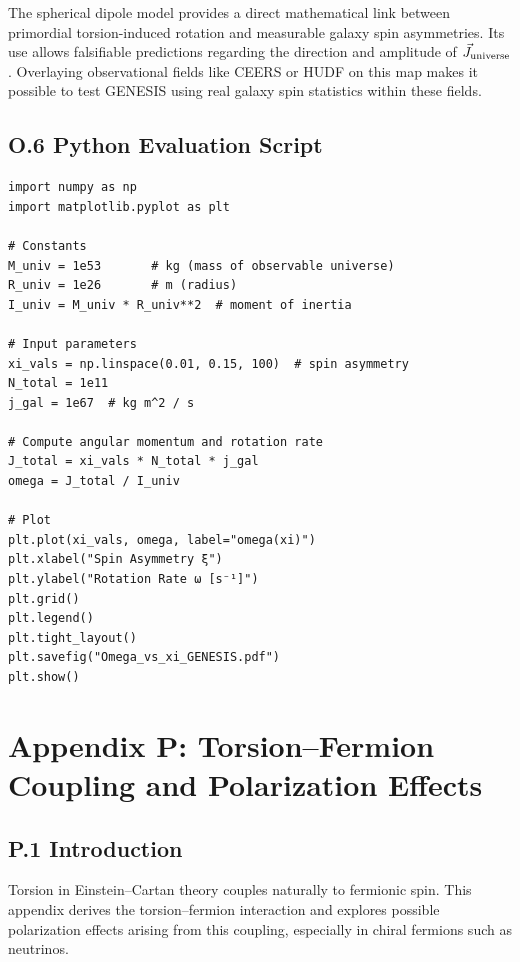 \documentclass{article}
\begin{document}
\begin{tcolorbox}[colback=gray!5, colframe=black!30, title=Why this matters]
The spherical dipole model provides a direct mathematical link between primordial torsion-induced rotation and measurable galaxy spin asymmetries. Its use allows falsifiable predictions regarding the direction and amplitude of $\vec{J}_{\rm universe}$. Overlaying observational fields like CEERS or HUDF on this map makes it possible to test GENESIS using real galaxy spin statistics within these fields.
\end{tcolorbox}


\subsection*{O.6 Python Evaluation Script}

\begin{verbatim}
import numpy as np
import matplotlib.pyplot as plt

# Constants
M_univ = 1e53       # kg (mass of observable universe)
R_univ = 1e26       # m (radius)
I_univ = M_univ * R_univ**2  # moment of inertia

# Input parameters
xi_vals = np.linspace(0.01, 0.15, 100)  # spin asymmetry
N_total = 1e11
j_gal = 1e67  # kg m^2 / s

# Compute angular momentum and rotation rate
J_total = xi_vals * N_total * j_gal
omega = J_total / I_univ

# Plot
plt.plot(xi_vals, omega, label="omega(xi)")
plt.xlabel("Spin Asymmetry ξ")
plt.ylabel("Rotation Rate ω [s⁻¹]")
plt.grid()
plt.legend()
plt.tight_layout()
plt.savefig("Omega_vs_xi_GENESIS.pdf")
plt.show()
\end{verbatim}






\section*{Appendix P: Torsion–Fermion Coupling and Polarization Effects}
\label{app:torsion-fermion}

\subsection*{P.1 Introduction}
Torsion in Einstein–Cartan theory couples naturally to fermionic spin. This appendix derives the torsion–fermion interaction and explores possible polarization effects arising from this coupling, especially in chiral fermions such as neutrinos.
\end{document}
